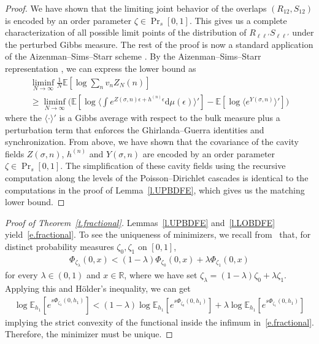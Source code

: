 \documentclass[11pt]{amsart}
\theoremstyle{remark}
\theoremstyle{definition}
\numberwithin{equation}{section}
\numberwithin{proposition}{section}
\numberwithin{figure}{section}
\numberwithin{table}{section}
\newcommand{\R}{\mathbb{R}}
\newcommand{\E}{\mathbb{E}}
\renewcommand{\geq}{\geqslant}
\newcommand{\Ll}{\left}
\newcommand{\Rr}{\right}
\renewcommand{\d}{\mathrm{d}}
\newcommand{\1}{\mathbf{1}}
\newcommand{\pnp}{{(n)}}
\begin{document}
\begin{proof}
We have shown that the limiting joint behavior of the overlaps $(R_{12},S_{12})$ is encoded by an order parameter $\zeta \in \Pr_s[0,1]$. This gives us a complete characterization of all possible limit points of the distribution of $R_{\ell\ell'}S_{\ell\ell'}$ under the perturbed Gibbs measure. The rest of the proof is now a standard application of the Aizenman--Sims--Starr scheme \cite[Chapter~3]{pan}. By the Aizenman--Sims--Starr representation \cite[Theorem~3.6]{pan}, we can express the lower bound as 
\begin{multline*}
	\liminf_{N \to \infty} \frac{1}{N} \E\Ll[ \log \sum_{n} v_n Z_N(n) \Rr]
	\\\geq \liminf_{N \to \infty} \bigg( \E \Ll[ \log \bigg\langle \int e^{ Z(\sigma,n) \epsilon + h^\pnp \epsilon} \d\mu(\epsilon)  \bigg\rangle'\Rr]  -  \E \Ll[ \log \langle e^{Y(\sigma,n)} \rangle'  \Rr] \bigg)
\end{multline*}
where the $\langle \cdot \rangle'$ is a Gibbs average with respect to the bulk measure plus a perturbation term that enforces the Ghirlanda--Guerra identities and synchronization. From above, we have shown that the covariance of the cavity fields $Z(\sigma,n)$, $h^\pnp$ and $Y(\sigma,n)$ are encoded by an order parameter $\zeta \in \Pr_s[0,1]$. The simplification of these cavity fields using the recursive computation along the levels of the Poisson--Dirichlet cascades is identical to the computations in the proof of Lemma~\ref{l.UPBDFE}, which gives us the matching lower bound. 
\end{proof}


\begin{proof}[Proof of Theorem~\ref{t.fractional}]
Lemmas~\ref{l.UPBDFE} and~\ref{l.LOBDFE} yield~\eqref{e.fractional}. 
To see the uniqueness of minimizers, we recall from~\cite[Theorem~4]{auffinger2015parisi} that, for distinct probability measures $\zeta_0,\zeta_1$ on $[0,1]$, 
\begin{align}\label{e.Phi_convexity}
    \Phi_{\zeta_\lambda}(0,x)<(1-\lambda) \Phi_{\zeta_0}(0,x) + \lambda \Phi_{\zeta_1}(0,x)
\end{align}
for every $\lambda\in(0,1)$ and $x\in\R$, where we have set $\zeta_\lambda = (1-\lambda)\zeta_0 + \lambda \zeta_1$. Applying this and Hölder's inequality, we can get
\begin{align}\label{e.logEePhi_convexity}
    \log\E_{h_1}\Ll[e^{s\Phi_{\zeta_\lambda}(0,h_1)}\Rr] <(1-\lambda) \log\E_{h_1}\Ll[e^{s\Phi_{\zeta_0}(0,h_1)}\Rr] + \lambda \log\E_{h_1}\Ll[e^{s\Phi_{\zeta_1}(0,h_1)}\Rr]
\end{align}
implying the strict convexity of the functional inside the infimum in~\eqref{e.fractional}. Therefore, the minimizer must be unique.
\end{proof}
\end{document}
